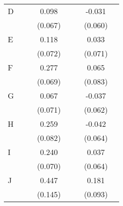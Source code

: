 {\begin{longtable}{l*{3}{c}|l*{3}{c}}
		D                   &                     &                     &       0.098         &                     &                     &      -0.031         \\
		&                     &                     &     (0.067)         &                     &                     &     (0.060)         \\
		E                   &                     &                     &       0.118         &                     &                     &       0.033         \\
		&                     &                     &     (0.072)         &                     &                     &     (0.071)         \\
		F                   &                     &                     &       0.277\sym{***}&                     &                     &       0.065         \\
		&                     &                     &     (0.069)         &                     &                     &     (0.083)         \\
		G                   &                     &                     &       0.067         &                     &                     &      -0.037         \\
		&                     &                     &     (0.071)         &                     &                     &     (0.062)         \\
		H                   &                     &                     &       0.259\sym{**} &                     &                     &      -0.042         \\
		&                     &                     &     (0.082)         &                     &                     &     (0.064)         \\
		I                   &                     &                     &       0.240\sym{***}&                     &                     &       0.037         \\
		&                     &                     &     (0.070)         &                     &                     &     (0.064)         \\
		J                   &                     &                     &       0.447\sym{**} &                     &                     &       0.181         \\
		&                     &                     &     (0.145)         &                     &                     &     (0.093)         \\

\end{longtable}}
